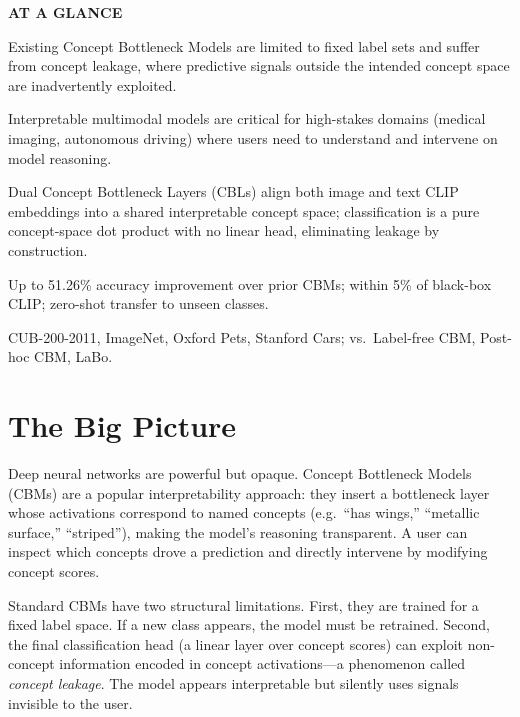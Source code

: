 \documentclass[10pt,twocolumn]{article}
\begin{document}
\begin{mdframed}[backgroundcolor=boxgray,linecolor=rulered,linewidth=1pt,
    innerleftmargin=6pt,innerrightmargin=6pt,
    innertopmargin=6pt,innerbottommargin=6pt]
\textbf{\small AT A GLANCE}\par\vspace{4pt}
\begin{description}[leftmargin=0pt,labelsep=4pt,itemsep=2pt,parsep=0pt,
    font=\small\bfseries]
  \item[Problem:] Existing Concept Bottleneck Models are limited to fixed
    label sets and suffer from concept leakage, where predictive signals
    outside the intended concept space are inadvertently exploited.
  \item[Why it matters:] Interpretable multimodal models are critical for
    high-stakes domains (medical imaging, autonomous driving) where users
    need to understand and intervene on model reasoning.
  \item[Method:] Dual Concept Bottleneck Layers (CBLs) align both image
    and text CLIP embeddings into a shared interpretable concept space;
    classification is a pure concept-space dot product with no linear
    head, eliminating leakage by construction.
  \item[Result:] Up to 51.26\% accuracy improvement over prior CBMs;
    within 5\% of black-box CLIP; zero-shot transfer to unseen classes.
  \item[Evidence:] CUB-200-2011, ImageNet, Oxford Pets, Stanford Cars;
    vs.\ Label-free CBM, Post-hoc CBM, LaBo.
\end{description}
\end{mdframed}

\section{The Big Picture}

Deep neural networks are powerful but opaque. Concept Bottleneck Models
(CBMs) are a popular interpretability approach: they insert a bottleneck
layer whose activations correspond to named concepts (e.g.\ ``has wings,''
``metallic surface,'' ``striped''), making the model's reasoning transparent.
A user can inspect which concepts drove a prediction and directly intervene
by modifying concept scores.

Standard CBMs have two structural limitations. First, they are trained for
a fixed label space. If a new class appears, the model must be retrained.
Second, the final classification head (a linear layer over concept scores)
can exploit non-concept information encoded in concept activations---a
phenomenon called \emph{concept leakage}. The model appears interpretable
but silently uses signals invisible to the user.
\end{document}
